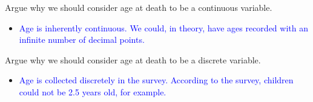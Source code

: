 \documentclass[10pt,t]{beamer}
\begin{document}
\begin{frame}

Argue why we should consider age at death to be a continuous variable.
	
	\vspace{0.3cm}
	
	\begin{itemize}
		\item[] \textcolor{blue}{Age is inherently continuous. We could, in theory, have ages recorded with an infinite number of decimal points.}
	\end{itemize}
	
		
	
	\vspace{0.3cm}
	
	Argue why we should consider age at death to be a discrete variable.
	
	\vspace{0.3cm}
	
	\begin{itemize}
		\item[] 	\textcolor{blue}{Age is collected discretely in the survey. According to the survey, children could not be 2.5 years old, for example. }
	\end{itemize}

	

\end{frame}
\end{document}

